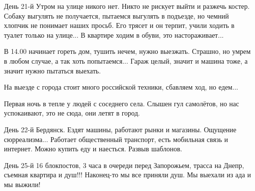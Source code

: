 День 21-й Утром на улице никого нет. Никто не рискует выйти и разжечь костер.
Собаку выгулять не получается, пытаемся выгулять в подъезде, но чемний хлопчик
не понимает наших просьб. Его трясет и он терпит, учили ходить в туалет только
на улице... В квартире ходим в обуви, это настораживает...

В 14.00 начинает гореть дом, тушить нечем, нужно выезжать. Страшно, но умрем в
любом случае, а так хоть попытаемся... Гараж целый, значит и машина тоже, а
значит нужно пытаться выехать.

На выезде с города стоит много российской техники, сбавляем ход, но едем... 

Первая ночь в тепле у людей с соседнего села. Слышен гул самолётов, но нас
успокаивают, это не сюда, они летят в город.

День 22-й Бердянск. Ездят машины, работают рынки и магазины. Ощущение
сюрреализма... Работает общественный транспорт, есть мобильная связь и
интернет. Можно купить еду и наесться. Развыв шаблонов.

День 25-й 16 блокпостов, 3 часа в очереди перед Запорожьем, трасса на Днепр,
съемная квартира и душ!!! Наконец-то мы все приняли душ. Мы выехали из ада и мы
выжили!

